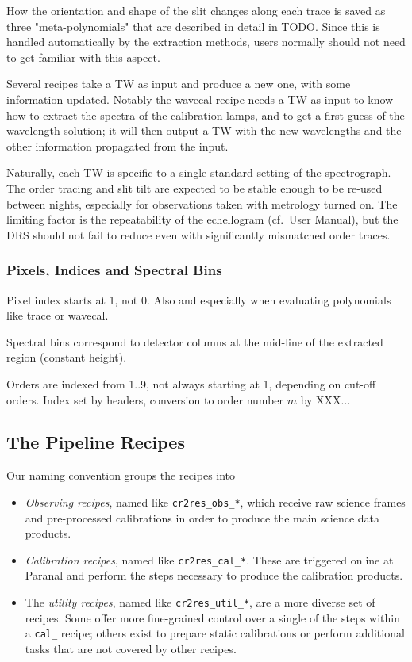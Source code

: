 How the orientation and shape of the slit changes along each trace is saved as
three "meta-polynomials" that are described in detail in TODO. Since this is
handled automatically by the extraction methods, users normally should not need
to get familiar with this aspect.

Several recipes take a TW as input and produce a new one, with some information
updated. Notably the wavecal recipe needs a TW as input to know how to extract
the spectra of the calibration lamps, and to get a first-guess of the
wavelength solution; it will then output a TW with the new wavelengths and
the other information propagated from the input.

Naturally, each TW is specific to a single standard setting of the spectrograph.
The order tracing and slit tilt are expected to be stable enough to be re-used
between nights, especially for observations taken with metrology turned on. The
limiting factor is the repeatability of the echellogram (cf.~User Manual), but
the DRS should not fail to reduce even with significantly mismatched order
traces.

\subsubsection{Pixels, Indices and Spectral Bins}
Pixel index starts at 1, not 0. Also and especially when evaluating polynomials like trace or wavecal.

Spectral bins correspond to detector columns at the mid-line of the extracted
region (constant height).

Orders are indexed from 1..9, not always starting at 1, depending on cut-off
orders. Index set by headers, conversion to order number $m$ by XXX...

\subsection{The Pipeline Recipes}
\label{sec:recipes-quick}

Our naming convention groups the recipes into
\begin{itemize}
    \item \textit{Observing recipes}, named like \texttt{cr2res\_obs\_*}, which
    receive raw science frames and pre-processed calibrations in order to
    produce the main science data products.
    \item \textit{Calibration recipes}, named like \texttt{cr2res\_cal\_*}. These are triggered online at Paranal and perform the steps necessary to produce the calibration products.
    \item The \textit{utility recipes}, named like \texttt{cr2res\_util\_*}, are a more diverse set of recipes. Some offer more fine-grained control over a single of the steps within a \texttt{cal\_} recipe; others exist to prepare static calibrations or perform additional tasks that are not covered by other recipes.
\end{itemize}

